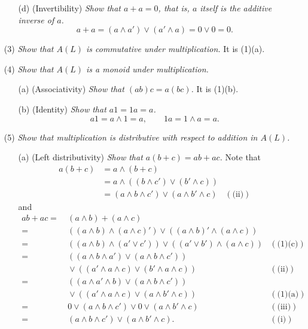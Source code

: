 \documentclass{article}
\begin{document}
\begin{enumerate}
\begin{enumerate}
  \item[(d)]
    (Invertibility)
    \emph{Show that $a + a = 0$, that is, $a$ itself is the additive inverse of $a$.}
    \[
      a + a
      = (a \wedge a') \vee (a' \wedge a)
      = 0 \vee 0
      = 0.
    \]
  \end{enumerate}

\item[(3)]
  \emph{Show that $A(L)$ is commutative under multiplication.}
  It is (1)(a).

\item[(4)]
  \emph{Show that $A(L)$ is a monoid under multiplication.}
  \begin{enumerate}
  \item[(a)]
    (Associativity)
    \emph{Show that $(ab)c = a(bc)$.}
    It is (1)(b).

  \item[(b)]
    (Identity)
    \emph{Show that $a1 = 1a = a$.}
    \[
      a1 = a \wedge 1 = a,
      \qquad
      1a = 1 \wedge a = a.
    \]
  \end{enumerate}

\item[(5)]
  \emph{Show that multiplication is distributive with respect to addition in $A(L)$.}
  \begin{enumerate}
  \item[(a)]
    (Left distributivity)
    \emph{Show that $a(b+c) = ab + ac$.}
    Note that
    \begin{align*}
      a(b+c)
      &= a \wedge (b+c) \\
      &= a \wedge ((b \wedge c') \vee (b' \wedge c)) \\
      &= (a \wedge b \wedge c') \vee (a \wedge b' \wedge c)
        &(\text{(ii)})
    \end{align*}
    and
    \begin{align*}
      ab + ac
      =& \: (a \wedge b) + (a \wedge c) \\
      =& \: ((a \wedge b) \wedge (a \wedge c)') \vee ((a \wedge b)' \wedge (a \wedge c)) \\
      =& \: ((a \wedge b) \wedge (a' \vee c')) \vee ((a' \vee b') \wedge (a \wedge c))
        &(\text{(1)(c)}) \\
      =& \: ((a \wedge b \wedge a') \vee (a \wedge b \wedge c')) \\
          & \: \vee ((a' \wedge a \wedge c) \vee (b' \wedge a \wedge c))
        &(\text{(ii)}) \\
      =& \: ((a \wedge a' \wedge b) \vee (a \wedge b \wedge c')) \\
          & \: \vee ((a' \wedge a \wedge c) \vee (a \wedge b' \wedge c))
        &(\text{(1)(a)}) \\
      =& \: 0 \vee (a \wedge b \wedge c') \vee 0 \vee (a \wedge b' \wedge c)
        &(\text{(iii)}) \\
      =& \: (a \wedge b \wedge c') \vee (a \wedge b' \wedge c).
        &(\text{(i)})
    \end{align*}


\end{enumerate}
\end{enumerate}
\end{document}
